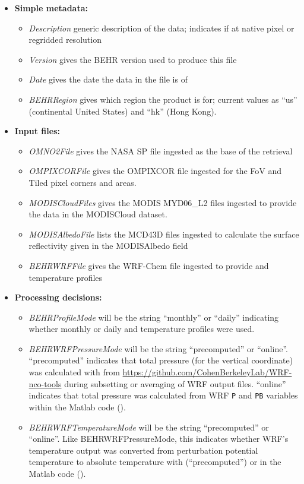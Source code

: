 \documentclass[12pt]{article}
\begin{document}
	\begin{itemize}
	\item \textbf{Simple metadata:}
		\begin{itemize}
		\item \emph{Description} generic description of the data; indicates if at native pixel or regridded resolution
		\item \emph{Version} gives the BEHR version used to produce this file
		\item \emph{Date} gives the date the data in the file is of
		
		\item \emph{BEHRRegion} gives which region the product is for; current values as ``us'' (continental United States) and ``hk'' (Hong Kong).
		\end{itemize}
		
	\item \textbf{Input files:}
		\begin{itemize}
		\item \emph{OMNO2File} gives the NASA SP file ingested as the base of the retrieval
		\item \emph{OMPIXCORFile} gives the OMPIXCOR file ingested for the FoV and Tiled pixel corners and areas.
		\item \emph{MODISCloudFiles} gives the MODIS MYD06\_L2 files ingested to provide the data in the MODISCloud dataset.
		\item \emph{MODISAlbedoFile} lists the MCD43D files ingested to calculate the surface reflectivity given in the MODISAlbedo field
		\item \emph{BEHRWRFFile} gives the WRF-Chem file ingested to provide  and temperature profiles
		\end{itemize}
		
	\item \textbf{Processing decisions:}
		\begin{itemize}
		\item \emph{BEHRProfileMode} will be the string ``monthly'' or ``daily'' indicating whether monthly or daily  and temperature profiles were used.
		\item \emph{BEHRWRFPressureMode} will be the string ``precomputed'' or ``online''.  ``precomputed'' indicates that total pressure (for the vertical coordinate) was calculated with  from \url{https://github.com/CohenBerkeleyLab/WRF-nco-tools} during subsetting or averaging of WRF output files.  ``online'' indicates that total pressure was calculated from WRF \lstinline$P$ and \lstinline$PB$ variables within the Matlab code ().
		\item \emph{BEHRWRFTemperatureMode} will be the string ``precomputed'' or ``online''. Like BEHRWRFPressureMode, this indicates whether WRF's temperature output was converted from perturbation potential temperature to absolute temperature with  (``precomputed'') or in the Matlab code ().
		\end{itemize}
		

\end{itemize}
\end{document}
